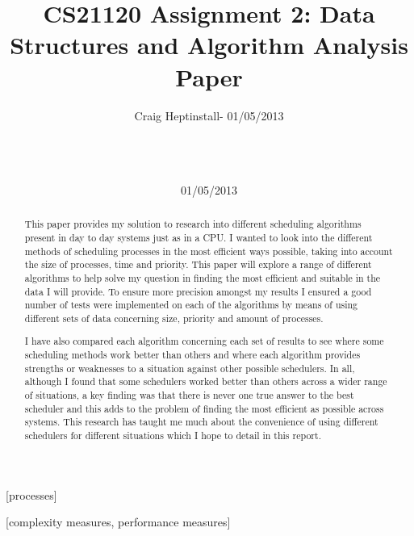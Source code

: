 \documentclass{sig-alternate}
\begin{document}

\title{{\ttlit CS21120 Assignment 2:} Data Structures and Algorithm Analysis
Paper
}


\author{
\alignauthor
Craig Heptinstall- 01/05/2013\\
       \\
       \\
       \\
       \date{01/05/2013}
}
\maketitle
\begin{abstract}
This paper provides my solution to research into different scheduling
algorithms present in day to day systems just as in  a CPU. I wanted to look
into the different methods of scheduling processes in the most efficient ways
possible, taking into account the size of processes, time and priority. This
paper will explore a range of different algorithms to help solve my question in
finding the most efficient and suitable in the data I will provide. To ensure
more precision amongst my results I ensured a good number of tests were
implemented on each of the algorithms by means of using different sets of data
concerning size, priority and amount of processes. 

I have also compared each algorithm concerning each set of results to see where
some scheduling methods work better than others and where each algorithm
provides strengths or weaknesses to a situation against other possible
schedulers. In all, although I found that some schedulers worked better than
others across a wider range of situations, a key finding was that there is
never one true answer to the best scheduler and this adds to the problem of
finding the most efficient as possible across systems. This research has taught
me much about the convenience of using different schedulers for different
situations which I hope to detail in this report.
\end{abstract}

[processes]

[complexity measures, performance
measures]
\end{document}
